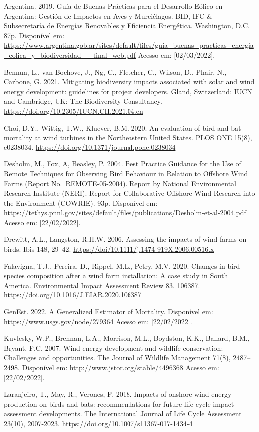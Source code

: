\documentclass[
  oneside]{scrbook}
\begin{document}
Argentina. 2019. Guía de Buenas Prácticas para el Desarrollo Eólico en Argentina: Gestión de Impactos en Aves y Murciélagos. BID, IFC \& Subsecretaría de Energías Renovables y Eficiencia Energética. Washington, D.C. 87p. Disponível em: \url{https://www.argentina.gob.ar/sites/default/files/guia_buenas_practicas_energia_eolica_y_biodiversidad_-_final_web.pdf} Acesso em: {[}02/03/2022{]}.

Bennun, L., van Bochove, J., Ng, C., Fletcher, C., Wilson, D., Phair, N., Carbone, G. 2021. Mitigating biodiversity impacts associated with solar and wind energy development: guidelines for project developers. Gland, Switzerland: IUCN and Cambridge, UK: The Biodiversity Consultancy. \url{https://doi.org/10.2305/IUCN.CH.2021.04.en}

Choi, D.Y., Wittig, T.W., Kluever, B.M. 2020. An evaluation of bird and bat mortality at wind turbines in the Northeastern United States. PLOS ONE 15(8), e0238034. \url{https://doi.org/10.1371/journal.pone.0238034}

Desholm, M., Fox, A, Beasley, P. 2004. Best Practice Guidance for the Use of Remote Techniques for Observing Bird Behaviour in Relation to Offshore Wind Farms (Report No.~REMOTE-05-2004). Report by National Environmental Research Institute (NERI). Report for Collaborative Offshore Wind Research into the Environment (COWRIE). 93p. Disponível em: \url{https://tethys.pnnl.gov/sites/default/files/publications/Desholm-et-al-2004.pdf} Acesso em: {[}22/02/2022{]}.

Drewitt, A.L., Langston, R.H.W. 2006. Assessing the impacts of wind farms on birds. Ibis 148, 29--42. \url{https://doi/10.1111/j.1474-919X.2006.00516.x}

Falavigna, T.J., Pereira, D., Rippel, M.L., Petry, M.V. 2020. Changes in bird species composition after a wind farm installation: A case study in South America. Environmental Impact Assessment Review 83, 106387. \url{https://doi.org/10.1016/J.EIAR.2020.106387}

GenEst. 2022. A Generalized Estimator of Mortality. Disponível em: \url{https://www.usgs.gov/node/279364} Acesso em: {[}22/02/2022{]}.

Kuvlesky, W.P., Brennan, L.A., Morrison, M.L., Boydston, K.K., Ballard, B.M., Bryant, F.C. 2007. Wind energy development and wildlife conservation: Challenges and opportunities. The Journal of Wildlife Management 71(8), 2487--2498. Disponível em: \url{http://www.jstor.org/stable/4496368} Acesso em: {[}22/02/2022{]}.

Laranjeiro, T., May, R., Verones, F. 2018. Impacts of onshore wind energy production on birds and bats: recommendations for future life cycle impact assessment developments. The International Journal of Life Cycle Assessment 23(10), 2007-2023. \url{https://doi.org/10.1007/s11367-017-1434-4}
\end{document}

